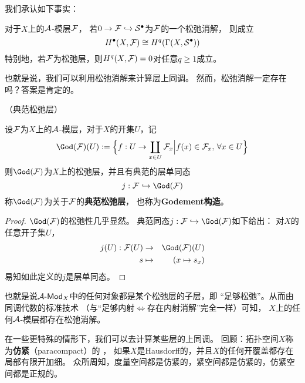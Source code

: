 我们承认如下事实：

\begin{thm}对于$X$上的$\mathcal{A}$-模层$\mathcal{F}$，
若$0\to\mathcal{F}\hookrightarrow\mathcal{S}^{\bullet}$为$\mathcal{F}$的一个松弛消解，
则成立
$$
  H^{\bullet}(X,\mathcal{F})\cong H^q(\Gamma(X,\mathcal{S}^{\bullet}))
$$
特别地，若$\mathcal{F}$为松弛层，则$H^q(X,\mathcal{F})=0$对任意$q\geq 1$成立。
\end{thm}

也就是说，我们可以利用松弛消解来计算层上同调。
然而，松弛消解一定存在吗？答案是肯定的。

\begin{notation}（典范松弛层）

设$\mathcal{F}$为$X$上的$\mathcal{A}$-模层，对于$X$的开集$U$，记
$$
  \God(\mcalF)(U)
:=
  \Bigset
  {f:U\to\coprod_{x\in U}\mcalF_x}
  {f(x)\in\mcalF_x,\,\forall x\in U}
$$
则$\God(\mcalF)$为$X$上的松弛层，并且有典范的层单同态
$$j:\mcalF\inj\God(\mcalF)$$
称$\God(\mcalF)$为关于$\mathcal{F}$的\textbf{典范松弛层}，
也称为\textbf{Godement构造}。
\end{notation}

\begin{proof}
$\God(\mcalF)$的松弛性几乎显然。
典范同态$j:\mcalF\inj\God(\mcalF)$如下给出：
对$X$的任意开子集$U$，
\begin{eqnarray*}
  j(U):\mcalF(U)&\to&\God(\mcalF)(U)\\
  s&\mapsto&(x\mapsto s_x)
\end{eqnarray*}
易知如此定义的$j$是层单同态。
\end{proof}

也就是说$\mathcal{A}\operatorname{\!\text{-}\mathsf{Mod}}_X$中的任何对象都是某个松弛层的子层，即
“足够松弛”。从而由同调代数的标准技术
（与“足够内射$\iff$存在内射消解”完全一样）可知，
$X$上的任何$\mathcal{A}$-模层都存在松弛消解。


在一些更特殊的情形下，我们可以去计算某些层的上同调。
回顾：拓扑空间$X$称为\textbf{仿紧}（paracompact）的
，
如果$X$是Hausdorff的，并且$X$的任何开覆盖都存在局部有限开加细。
众所周知，度量空间都是仿紧的，紧空间都是仿紧的，仿紧空间都是正规的。


